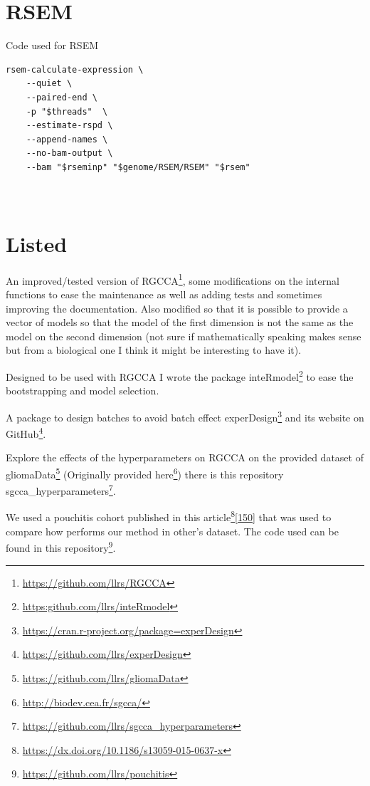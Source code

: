 \documentclass[
  12pt,
  a4paper,
  twoside,
  openright]{book}
\DeclareRobustCommand{\href}[2]{#2\footnote{\url{#1}}}
\begin{document}
\hypertarget{rsem}{%
\section{RSEM}\label{rsem}}

Code used for RSEM

\begin{verbatim}
rsem-calculate-expression \
    --quiet \
    --paired-end \
    -p "$threads"  \
    --estimate-rspd \
    --append-names \
    --no-bam-output \
    --bam "$rseminp" "$genome/RSEM/RSEM" "$rsem"
    
    
\end{verbatim}

\hypertarget{listed}{%
\section{Listed}\label{listed}}

An improved/tested version of \href{https://github.com/llrs/RGCCA}{RGCCA}, some modifications on the internal functions to ease the maintenance as well as adding tests and sometimes improving the documentation.
Also modified so that it is possible to provide a vector of models so that the model of the first dimension is not the same as the model on the second dimension (not sure if mathematically speaking makes sense but from a biological one I think it might be interesting to have it).

Designed to be used with RGCCA I wrote the package \href{https:github.com/llrs/inteRmodel}{inteRmodel} to ease the bootstrapping and model selection.

A package to design batches to avoid batch effect \href{https://cran.r-project.org/package=experDesign}{experDesign} and its website on \href{https://github.com/llrs/experDesign}{GitHub}.

Explore the effects of the hyperparameters on RGCCA on the provided dataset of \href{https://github.com/llrs/gliomaData}{gliomaData} (Originally provided \href{http://biodev.cea.fr/sgcca/}{here}) there is this repository \href{https://github.com/llrs/sgcca_hyperparameters}{sgcca\_hyperparameters}.

We used a pouchitis cohort published in this \href{https://dx.doi.org/10.1186/s13059-015-0637-x}{article}{[}\protect\hyperlink{ref-morgan2015}{150}{]} that was used to compare how performs our method in other's dataset.
The code used can be found in \href{https://github.com/llrs/pouchitis}{this repository}.
\end{document}
